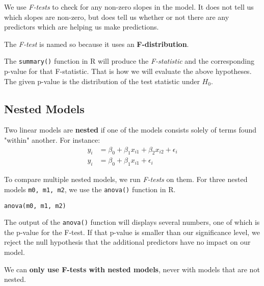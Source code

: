 \documentclass[titlepage, 12pt, leqno]{article}
\begin{document}
We use \textit{F-tests} to check for any non-zero slopes in the model. It does not
tell us which slopes are non-zero, but does tell us whether or not there are any
predictors which are helping us make predictions.

The \textit{F-test} is named so because it uses an \textbf{F-distribution}.

\begin{note}
    The \texttt{summary()} function in R will produce the \textit{F-statistic}
    and the corresponding p-value for that F-statistic. That is how we will 
    evaluate the above hypotheses. The given p-value is the distribution of the
    test statistic under $H_0$.
\end{note}

\pagebreak
\subsection{Nested Models}
\begin{definition}
    Two linear models are \textbf{nested} if one of the models consists solely of
    terms found "within" another. For instance:
   \begin{align*}
       y_i &= \beta_0 + \beta_1x_{i1} + \beta_2x_{i2} + \epsilon_i \\
       y_i &= \beta_0 + \beta_1x_{i1} + \epsilon_i
   \end{align*}
\end{definition}

To compare multiple nested models, we run \textit{F-tests} on them. For three
nested models \texttt{m0, m1, m2}, we use the \texttt{anova()} function in R.

\begin{verbatim}
anova(m0, m1, m2)
\end{verbatim}

The output of the \texttt{anova()} function will displays several numbers, one of
which is the p-value for the F-test. If that p-value is smaller than our
significance level, we reject the null hypothesis that the additional predictors
have no impact on our model.

\begin{note}
    We can \textbf{only use F-tests with nested models}, never with models that
    are not nested.
\end{note}
\end{document}
